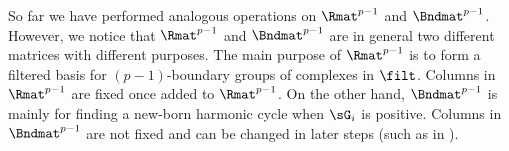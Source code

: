 \begin{remark}
So far we have performed analogous operations on 
$\Rmat^{p-1}$ and $\Bndmat^{p-1}$.
However,
we notice that $\Rmat^{p-1}$ and $\Bndmat^{p-1}$
are in general two different matrices with different purposes.
The main purpose of $\Rmat^{p-1}$ is to form a filtered 
basis for  $({p-1})$-boundary groups
of  complexes in $\filt$.
Columns in $\Rmat^{p-1}$ are {fixed}
once added to $\Rmat^{p-1}$.
On the other hand,
 $\Bndmat^{p-1}$ is mainly for 
finding a new-born harmonic cycle when $\sG_i$ is positive.
Columns in
$\Bndmat^{p-1}$
are not fixed and can be changed in later steps
(such as in ).
\end{remark}

